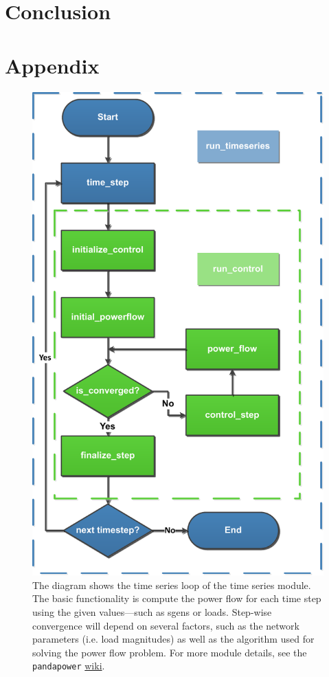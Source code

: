 \documentclass[a4paper,10pt]{report}
\begin{document}
\chapter{Conclusion}


\chapter*{Appendix}\label{chapter_appendix}

\FloatBarrier
\begin{figure}[htpb]
	\centering
	\includegraphics[width=0.45\linewidth]{timeseries_module_diag.pdf}
	\caption{The diagram shows the time series loop of the time series module. The basic functionality is compute the power flow for each time step using the given values---such as sgens or loads. Step-wise convergence will depend on several factors, such as the network parameters (i.e. load magnitudes) as well as the algorithm used for solving the power flow problem. For more module details, see the \texttt{pandapower}  \href{https://pandapower.readthedocs.io/en/v2.10.1/timeseries/timeseries_loop.html}{wiki}.}
	\label{timeseries_module_diag}
\end{figure}
\FloatBarrier
\end{document}
